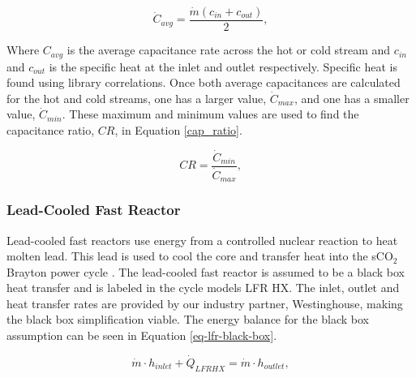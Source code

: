 \begin{paracol}{2}
\begin{equation}
    \label{avg_cap}
    \dot{C}_{avg} = \frac{\dot{m}(c_{in}+c_{out})}{2},
\end{equation}

Where $C_{avg}$ is the average capacitance rate across the hot or cold stream and $c_{in}$ and $c_{out}$ is the specific heat at the inlet and outlet respectively. Specific heat is found using library correlations. Once both average capacitances are calculated for the hot and cold streams, one has a larger value, $\dot{C}_{max}$, and one has a smaller value,  $\dot{C}_{min}$. These maximum and minimum values are used to find the capacitance ratio, $CR$, in Equation \ref{cap_ratio}.

\begin{equation}
    \label{cap_ratio}
    CR = \frac{\dot{C}_{min}}{\dot{C}_{max}},
\end{equation}


\subsubsection{Lead-Cooled Fast Reactor}
Lead-cooled fast reactors use energy from a controlled nuclear reaction to heat molten lead. This lead is used to cool the core and transfer heat into the sCO$_2$ Brayton power cycle \cite{smith_2016_lfr_background,alemberti_2013_lfr_overview}. The lead-cooled fast reactor is assumed to be a black box heat transfer and is labeled in the cycle models LFR HX. The inlet, outlet and heat transfer rates are provided by our industry partner, Westinghouse, making the black box simplification viable. The energy balance for the black box assumption can be seen in Equation \ref{eq-lfr-black-box}.

\begin{equation}
    \label{eq-lfr-black-box}
    \dot{m} \cdot h_{inlet} + \dot{Q}_{LFRHX} = \dot{m} \cdot h_{outlet},
\end{equation}


\end{paracol}
